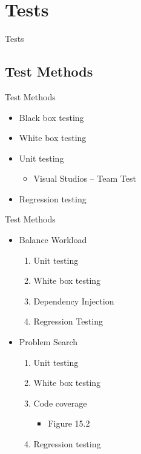 \section{Tests}
\begin{frame}{}
\begin{center}
\huge
Tests
\end{center}
\end{frame}
\subsection{Test Methods}
\begin{frame}{Test Methods}
	\begin{itemize}
		\item Black box testing
		\item White box testing
		\item Unit testing
		\begin{itemize}
				\item Visual Studios -- Team Test
		\end{itemize}
		\item Regression testing
	\end{itemize}
\end{frame}

\begin{frame}{Test Methods}
	\begin{itemize}
		\item Balance Workload
			\begin{enumerate}
				\item Unit testing
				\item White box testing
				\item Dependency Injection
				\item Regression Testing
			\end{enumerate}
		\item Problem Search
		\begin{enumerate}
				\item Unit testing
				\item White box testing
			\item Code coverage
			\begin{itemize}
			\item Figure 15.2
			\end{itemize}
			\item Regression testing
		\end{enumerate}
	\end{itemize}
\end{frame}